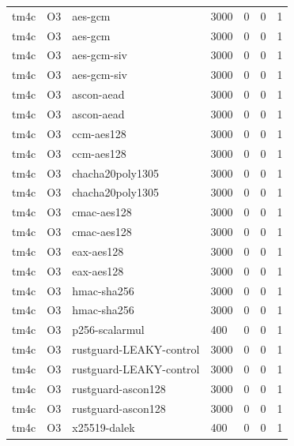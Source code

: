 \begin{table}[t]
\begin{tabular}{lllllll}
    tm4c & O3 & aes-gcm & 3000 & 0 & 0 & 1 \\
    tm4c & O3 & aes-gcm & 3000 & 0 & 0 & 1 \\
    tm4c & O3 & aes-gcm-siv & 3000 & 0 & 0 & 1 \\
    tm4c & O3 & aes-gcm-siv & 3000 & 0 & 0 & 1 \\
    tm4c & O3 & ascon-aead & 3000 & 0 & 0 & 1 \\
    tm4c & O3 & ascon-aead & 3000 & 0 & 0 & 1 \\
    tm4c & O3 & ccm-aes128 & 3000 & 0 & 0 & 1 \\
    tm4c & O3 & ccm-aes128 & 3000 & 0 & 0 & 1 \\
    tm4c & O3 & chacha20poly1305 & 3000 & 0 & 0 & 1 \\
    tm4c & O3 & chacha20poly1305 & 3000 & 0 & 0 & 1 \\
    tm4c & O3 & cmac-aes128 & 3000 & 0 & 0 & 1 \\
    tm4c & O3 & cmac-aes128 & 3000 & 0 & 0 & 1 \\
    tm4c & O3 & eax-aes128 & 3000 & 0 & 0 & 1 \\
    tm4c & O3 & eax-aes128 & 3000 & 0 & 0 & 1 \\
    tm4c & O3 & hmac-sha256 & 3000 & 0 & 0 & 1 \\
    tm4c & O3 & hmac-sha256 & 3000 & 0 & 0 & 1 \\
    tm4c & O3 & p256-scalarmul & 400 & 0 & 0 & 1 \\
    tm4c & O3 & rustguard-LEAKY-control & 3000 & 0 & 0 & 1 \\
    tm4c & O3 & rustguard-LEAKY-control & 3000 & 0 & 0 & 1 \\
    tm4c & O3 & rustguard-ascon128 & 3000 & 0 & 0 & 1 \\
    tm4c & O3 & rustguard-ascon128 & 3000 & 0 & 0 & 1 \\
    tm4c & O3 & x25519-dalek & 400 & 0 & 0 & 1 \\
    \bottomrule
  \end{tabular}
\end{table}
